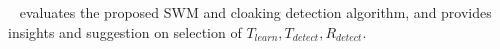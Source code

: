 ~\label{s:evaluation} evaluates the proposed SWM and cloaking detection
algorithm, and provides insights and suggestion on selection of $T_{learn}, T_{detect},
R_{detect}$.



%
%
%                                       
%
%
%
%
%
%
%

